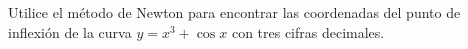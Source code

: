 \item Utilice el método de Newton para encontrar las coordenadas del punto de inflexión de la curva $y = x^3 + \cos x$ con tres cifras decimales.
